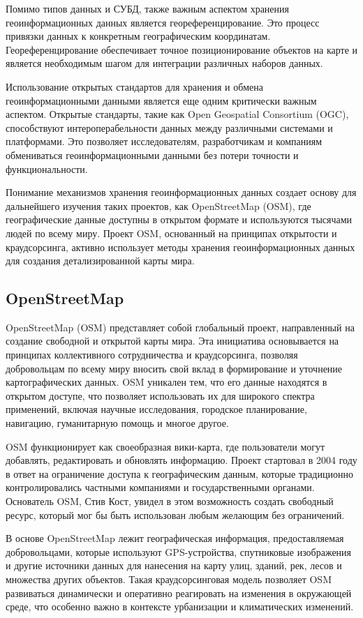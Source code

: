 Помимо типов данных и СУБД, также важным аспектом хранения геоинформационных данных является геореференцирование. Это процесс привязки данных к конкретным географическим координатам. Геореференцирование обеспечивает точное позиционирование объектов на карте и является необходимым шагом для интеграции различных наборов данных.

Использование открытых стандартов для хранения и обмена геоинформационными данными является еще одним критически важным аспектом. Открытые стандарты, такие как Open Geospatial Consortium (OGC), способствуют интероперабельности данных между различными системами и платформами. Это позволяет исследователям, разработчикам и компаниям обмениваться геоинформационными данными без потери точности и функциональности.

Понимание механизмов хранения геоинформационных данных создает основу для дальнейшего изучения таких проектов, как OpenStreetMap (OSM), где географические данные доступны в открытом формате и используются тысячами людей по всему миру. Проект OSM, основанный на принципах открытости и краудсорсинга, активно использует методы хранения геоинформационных данных для создания детализированной карты мира.

\subsection{OpenStreetMap}

OpenStreetMap (OSM) представляет собой глобальный проект, направленный на создание свободной и открытой карты мира. Эта инициатива основывается на принципах коллективного сотрудничества и краудсорсинга, позволяя добровольцам по всему миру вносить свой вклад в формирование и уточнение картографических данных. OSM уникален тем, что его данные находятся в открытом доступе, что позволяет использовать их для широкого спектра применений, включая научные исследования, городское планирование, навигацию, гуманитарную помощь и многое другое.

OSM функционирует как своеобразная вики-карта, где пользователи могут добавлять, редактировать и обновлять информацию. Проект стартовал в 2004 году в ответ на ограничение доступа к географическим данным, которые традиционно контролировались частными компаниями и государственными органами. Основатель OSM, Стив Кост, увидел в этом возможность создать свободный ресурс, который мог бы быть использован любым желающим без ограничений.

В основе OpenStreetMap лежит географическая информация, предоставляемая добровольцами, которые используют GPS-устройства, спутниковые изображения и другие источники данных для нанесения на карту улиц, зданий, рек, лесов и множества других объектов. Такая краудсорсинговая модель позволяет OSM развиваться динамически и оперативно реагировать на изменения в окружающей среде, что особенно важно в контексте урбанизации и климатических изменений.

